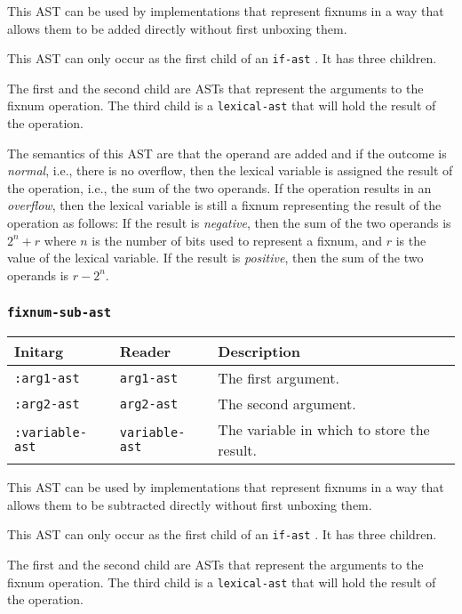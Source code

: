 This AST can be used by implementations that represent fixnums in a
way that allows them to be added directly without first unboxing
them.  

This AST can only occur as the first child of an \texttt{if-ast}
.  It has three children.

The first and the second child are ASTs that represent the arguments
to the fixnum operation.  The third child is a
\texttt{lexical-ast} that will hold the result of the operation.

The semantics of this AST are that the operand are added and if the
outcome is \emph{normal}, i.e., there is no overflow, then the lexical
variable is assigned the result of the operation, i.e., the sum of the
two operands.  If the operation results in an \emph{overflow}, then
the lexical variable is still a fixnum representing the result of the
operation as follows:  If the result is \emph{negative}, then the
sum of the two operands is $2^n + r$ where $n$ is the number of bits
used to represent a fixnum, and $r$ is the value of the lexical
variable.  If the result is \emph{positive}, then the sum of the two
operands is $r - 2^n$.

\subsubsection{\texttt{fixnum-sub-ast}}
\label{fixnum-sub-ast}

\begin{tabular}{|l|l|l|}
\hline
Initarg & Reader & Description\\
\hline\hline
\texttt{:arg1-ast} & \texttt{arg1-ast} & The first argument.\\
\hline
\texttt{:arg2-ast} & \texttt{arg2-ast} & The second argument.\\
\hline
\texttt{:variable-ast} & \texttt{variable-ast} & The variable in which to store the result.\\
\hline
\end{tabular}

This AST can be used by implementations that represent fixnums in a
way that allows them to be subtracted directly without first unboxing
them.

This AST can only occur as the first child of an \texttt{if-ast}
.  It has three children.

The first and the second child are ASTs that represent the arguments
to the fixnum operation.  The third child is a
\texttt{lexical-ast} that will hold the result of the operation.

